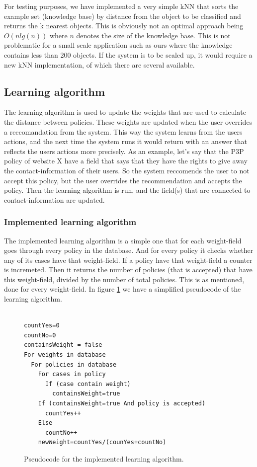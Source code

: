 For testing purposes, we have implemented a very simple kNN that sorts the example set (knowledge base) by distance from the object to be classified and returns the k nearest objects. This is obviously not an optimal approach being $O(n lg(n))$ where $n$ denotes the size of the knowledge base. This is not problematic for a small scale application such as ours where the knowledge contains less than 200 objects. If the system is to be scaled up, it would require a new kNN implementation, of which there are several available.


\subsection{Learning algorithm}\label{learnAlgos}
The learning algorithm is used to update the weights that are used to calculate the distance between policies. These weights are updated when the user overrides a reccomandation from the system. This way the system learns from the users actions, and the next time the system runs it would return with an answer that reflects the users actions more precisely. As an example, let's say that the P3P policy of website X have a field that says that they have the rights to give away the contact-information of their users. So the system reccomends the user to not accept this policy, but the user overrides the recommendation and accepts the policy. Then the learning algorithm is run, and the field(s) that are connected to contact-information are updated. 

\subsubsection{Implemented learning algorithm}
The implemented learning algorithm is a simple one that for each weight-field goes through every policy in the database. And for every policy it checks whether any of its cases have that weight-field. If a policy have that weight-field a counter is incremeted. Then it returns the number of policies (that is accepted) that have this weight-field, divided by the number of total policies. This is as mentioned, done for every weight-field. In figure \ref{pseudoLearnAlg} we have a simplified pseudocode of the learning algorithm.
 
\begin{figure}[htpb]

\begin{verbatim}

countYes=0
countNo=0
containsWeight = false
For weights in database
  For policies in database
    For cases in policy
      If (case contain weight)
        containsWeight=true
    If (containsWeight=true And policy is accepted)
      countYes++
    Else
      countNo++
    newWeight=countYes/(counYes+countNo)	
\end{verbatim}
\caption{Pseudocode for the implemented learning algorithm.}
\label{pseudoLearnAlg}
\end{figure}


